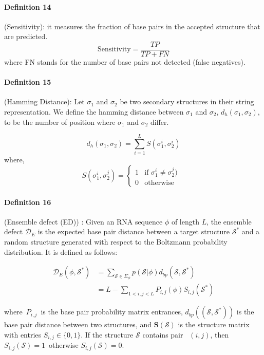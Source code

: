 \paragraph{\textbf{Definition 14}} (Sensitivity): it measures the fraction of
base pairs in the accepted structure that are predicted.
\begin{equation}
\text{Sensitivity} = \frac{TP}{TP+FN}
\end{equation}
where FN stands for the number of base pairs not detected (false
negatives).

\paragraph{\textbf{Definition 15}} (Hamming Distance):  Let $\sigma_1$ and $\sigma_2$ be two secondary structures in their string representation. We define the hamming distance between $\sigma_1$ and $\sigma_2$, $d_h(\sigma_1, \sigma_2)$, to be the number of position where $\sigma_1$ and $\sigma_2$ differ.  

\begin{equation}
	d_h(\sigma_1, \sigma_2) = \sum_{i=1}^{L}{S(\sigma_1^i, \sigma_2^i)}
\end{equation}
where, 
$$
S(\sigma_1^i, \sigma_2^j) =
\begin{cases}
1 & \text{if $\sigma_1^i \neq \sigma_2^j)$ } \\
0 & \text{otherwise}
\end{cases}
$$
\paragraph{\textbf{Definition 16}} (Ensemble defect (ED)) \citep{zadeh2011nucleic}: Given an RNA sequence $\phi$ of length $L$, the ensemble defect $\mathcal{D}_E$ is the expected base pair distance between a target structure $\mathcal{S}^*$  and a random structure generated with respect to the Boltzmann probability distribution. It is defined as follows: 

\begin{equation}
\label{ed}
\begin{split}
\mathcal{D}_E(\phi, \mathcal{S}^*) 
&= \sum_{\mathcal{S} \in \Sigma_{\phi}}{p(\mathcal{S}|\phi)d_{bp}(\mathcal{S},\mathcal{S}^*)}\\
&= L - \sum_{1<i,j<L} P_{i,j}(\phi)S_{i,j}(\mathcal{S}^*)
\end{split}
\end{equation}

where~\(P_{i,j}\)~is the base pair probability matrix entrances, $d_{bp} ((\mathcal{S},\mathcal{S}^*))$ is the base pair distance between two structures, and \(\mathbf{S}(\mathcal{S})\) is the structure matrix with entries \(S_{i,j} \in  \{ 0, 1\}\). If the structure \(\mathcal{S}\) contains pair~ $(i ,j)$, then \(S_{i,j}(\mathcal{S}) = 1\)~otherwise \(S_{i,j}(\mathcal{S}) = 0\).

